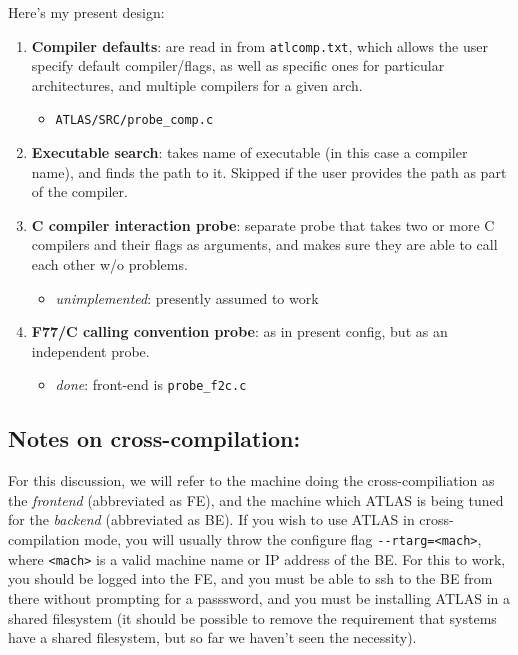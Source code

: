 \documentclass[11pt]{article}
\begin{document}
Here's my present design:
\begin{enumerate}
\item {\bf Compiler defaults}: are read in from {\tt atlcomp.txt}, which
      allows the user specify default compiler/flags, as well as specific
      ones for particular architectures, and multiple compilers for a given
      arch.  
   \begin{itemize}
      \item {\tt ATLAS/SRC/probe\_comp.c}
   \end{itemize}
\item {\bf Executable search}: takes name of executable (in this case
      a compiler name), and finds the path to it.  Skipped if the user
      provides the path as part of the compiler.
\item {\bf C compiler interaction probe}: separate probe that takes two or
      more C compilers and their flags as arguments, and makes sure they
      are able to call each other w/o problems.
   \begin{itemize}
   \item {\it unimplemented}: presently assumed to work
   \end{itemize}
\item {\bf F77/C calling convention probe}: as in present config, but as
      an independent probe.
   \begin{itemize}
   \item {\it done}: front-end is {\tt probe\_f2c.c}
   \end{itemize}
\end{enumerate}
\subsection{Notes on cross-compilation:}
For this discussion, we will refer to the machine doing the cross-compiliation
as the {\it frontend} (abbreviated as FE), and the machine which ATLAS is
being tuned for the {\it backend} (abbreviated as BE).
If you wish to use ATLAS in cross-compilation mode, you will usually
throw the configure flag \verb+--rtarg=<mach>+, where \verb+<mach>+ is
a valid machine name or IP address of the BE.  For this to work, you should
be logged into the FE, and you must be able to ssh to the BE
from there without prompting for a passsword,
and you must be installing ATLAS in a shared filesystem
(it should be possible to remove the requirement that systems have
a shared filesystem, but so far we haven't seen the necessity).
\end{document}

